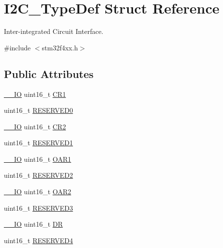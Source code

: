 \hypertarget{struct_i2_c___type_def}{}\section{I2\+C\+\_\+\+Type\+Def Struct Reference}
\label{struct_i2_c___type_def}


Inter-\/integrated Circuit Interface.  




{\ttfamily \#include $<$stm32f4xx.\+h$>$}

\subsection*{Public Attributes}
\begin{DoxyCompactItemize}
\item 
\hyperlink{core__cm4_8h_aec43007d9998a0a0e01faede4133d6be}{\+\_\+\+\_\+\+IO} uint16\+\_\+t \hyperlink{struct_i2_c___type_def_ad35ea0b199cefb757de20e9b78168534}{C\+R1}
\item 
uint16\+\_\+t \hyperlink{struct_i2_c___type_def_aee6ec4cf81ee0bb5b038576ba0d738a2}{R\+E\+S\+E\+R\+V\+E\+D0}
\item 
\hyperlink{core__cm4_8h_aec43007d9998a0a0e01faede4133d6be}{\+\_\+\+\_\+\+IO} uint16\+\_\+t \hyperlink{struct_i2_c___type_def_ac8bff45acc455489620d50e697a24c9d}{C\+R2}
\item 
uint16\+\_\+t \hyperlink{struct_i2_c___type_def_a6c3d147223993f2b832b508ee5a5178e}{R\+E\+S\+E\+R\+V\+E\+D1}
\item 
\hyperlink{core__cm4_8h_aec43007d9998a0a0e01faede4133d6be}{\+\_\+\+\_\+\+IO} uint16\+\_\+t \hyperlink{struct_i2_c___type_def_ad218fdcb9606477c1d63f8ee38d3c5c9}{O\+A\+R1}
\item 
uint16\+\_\+t \hyperlink{struct_i2_c___type_def_a5e98c83a176deeb4a8a68f9ca12fdfd2}{R\+E\+S\+E\+R\+V\+E\+D2}
\item 
\hyperlink{core__cm4_8h_aec43007d9998a0a0e01faede4133d6be}{\+\_\+\+\_\+\+IO} uint16\+\_\+t \hyperlink{struct_i2_c___type_def_a03189e2a57c81ae5d103739b72f52c93}{O\+A\+R2}
\item 
uint16\+\_\+t \hyperlink{struct_i2_c___type_def_a355b2c5aa0dd467de1f9dea4a9afe986}{R\+E\+S\+E\+R\+V\+E\+D3}
\item 
\hyperlink{core__cm4_8h_aec43007d9998a0a0e01faede4133d6be}{\+\_\+\+\_\+\+IO} uint16\+\_\+t \hyperlink{struct_i2_c___type_def_a5c1551b886fbb8e801b9203f6d7dc7c5}{DR}
\item 
uint16\+\_\+t \hyperlink{struct_i2_c___type_def_a05a1a3482d9534ba9ef976e3277040f0}{R\+E\+S\+E\+R\+V\+E\+D4}

\end{DoxyCompactItemize}
